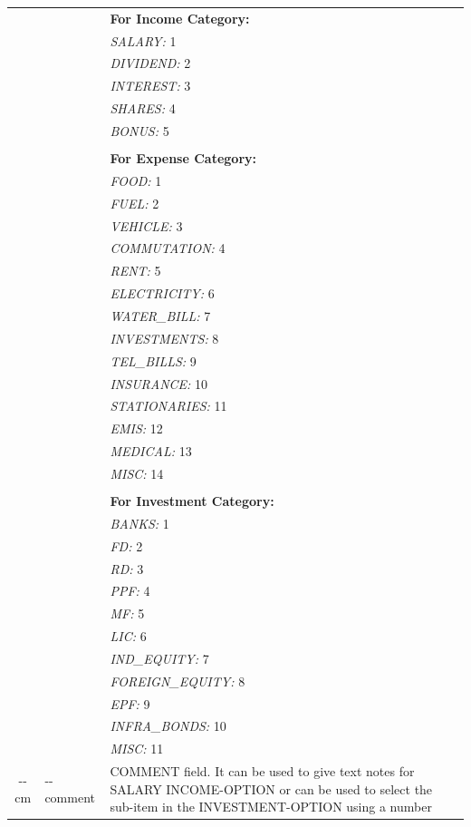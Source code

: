 \documentclass[a4paper,11pt]{book}
\begin{document}
\begin{table}[ht]
\begin{tabular}{c|l|| p{8cm}}
    && \textbf{For Income Category:}\\
    && \emph{SALARY: }   1\\
    && \emph{DIVIDEND: } 2\\
    && \emph{INTEREST: } 3\\
    && \emph{SHARES: }   4\\
    && \emph{BONUS: }    5\\
    \\
    && \textbf{For Expense Category:}\\
    && \emph{FOOD: } 1\\
    && \emph{FUEL: } 2\\
    && \emph{VEHICLE: } 3\\
    && \emph{COMMUTATION: } 4\\
    && \emph{RENT: } 5\\
    && \emph{ELECTRICITY: } 6\\
    && \emph{WATER\_BILL: } 7\\
    && \emph{INVESTMENTS: } 8\\
    && \emph{TEL\_BILLS: } 9\\
    && \emph{INSURANCE: } 10\\
    && \emph{STATIONARIES: } 11\\
    && \emph{EMIS: } 12\\
    && \emph{MEDICAL: } 13\\
    && \emph{MISC: } 14\\
    \\
    && \textbf{For Investment Category:}\\
    && \emph{BANKS: } 1\\
    && \emph{FD: } 2\\
    && \emph{RD: } 3\\
    && \emph{PPF: } 4\\
    && \emph{MF: } 5\\
    && \emph{LIC: } 6\\
    && \emph{IND\_EQUITY: } 7\\
    && \emph{FOREIGN\_EQUITY: } 8\\
    && \emph{EPF: } 9\\
    && \emph{INFRA\_BONDS: } 10\\
    && \emph{MISC: } 11\\
    \hline
    \hline
    
    \--\--cm & \--\--comment & COMMENT field. It can be used to give text notes for SALARY INCOME-OPTION or can be used to select the sub-item in the INVESTMENT-OPTION using a number\\ 
    \hline
    \hline
    

\end{tabular}
\end{table}
\end{document}
